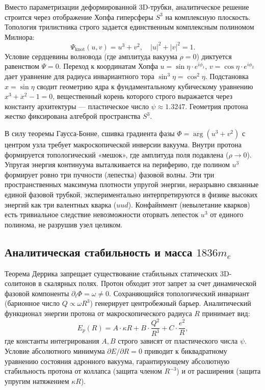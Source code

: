 \documentclass[12pt,a4paper]{article}
\begin{document}
Вместо параметризации деформированной 3D-трубки, аналитическое решение строится через отображение Хопфа гиперсферы $S^3$ на комплексную плоскость. Топология трилистника строго задается единственным комплексным полиномом Милнора:
\begin{equation}
	\Psi_{\text{knot}}(u, v) = u^3 + v^2, \quad |u|^2 + |v|^2 = 1.
\end{equation}
Условие сердцевины волновода (где амплитуда вакуума $\rho = 0$) диктуется равенством $\Psi = 0$. Переход к координатам Хопфа $u = \sin\eta \cdot e^{i\phi_1}$, $v = \cos\eta \cdot e^{i\phi_2}$ дает уравнение для радиуса инвариантного тора $\sin^3\eta = \cos^2\eta$. Подстановка $x = \sin\eta$ сводит геометрию ядра к фундаментальному кубическому уравнению $x^3 + x^2 - 1 = 0$, вещественный корень которого строго выражается через константу архитектуры — пластическое число $\psi \approx 1.3247$. Геометрия протона жестко фиксирована алгеброй пространства $S^3$.

В силу теоремы Гаусса-Бонне, сшивка градиента фазы $\Phi = \arg(u^3 + v^2)$ с центром узла требует макроскопической инверсии вакуума. Внутри протона формируется топологический «мешок», где амплитуда поля подавлена ($\rho \to 0$). Упругая энергия континуума выталкивается на периферию, где полином $u^3$ формирует ровно три пучности (лепестка) фазовой волны. Эти три пространственных максимума плотности упругой энергии, неразрывно связанные единой фазовой трубкой, экспериментально интерпретируются в физике высоких энергий как три валентных кварка ($uud$). Конфайнмент (невылетание кварков) есть тривиальное следствие невозможности оторвать лепесток $u^3$ от единого полинома, не разрушив узел целиком.

\subsection{Аналитическая стабильность и масса $1836 m_e$}
Теорема Деррика запрещает существование стабильных статических 3D-солитонов в скалярных полях. Протон обходит этот запрет за счет динамической фазовой компоненты $\partial_t \Phi = \omega \neq 0$. Сохраняющийся топологический инвариант (барионное число $Q \propto \omega R^3$) генерирует центробежный барьер.
Аналитический функционал энергии протона от макроскопического радиуса $R$ принимает вид:
\begin{equation}
	E_p(R) = A \cdot \kappa R + B \cdot \frac{Q^2}{R^3} + C \cdot \frac{e^2}{R},
\end{equation}
где константы интегрирования $A, B$ строго зависят от пластического числа $\psi$. Условие абсолютного минимума $\partial E / \partial R = 0$ приводит к биквадратному уравнению состояния адронного вакуума, гарантирующему абсолютную стабильность протона от коллапса (защита членом $R^{-3}$) и от расширения (защита упругим натяжением $\kappa R$).
\end{document}
